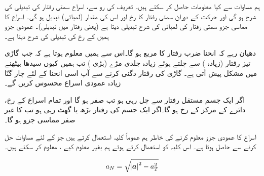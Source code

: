 ہم مساوات  سے کیا معلومات حاصل کر سکتے ہیں۔ تعریف کی رو سے،  اسراع  سمتی رفتار  کی  تبدیلی کی شرح ہو گی اور حرکت کے دوران سمتی رفتار کا رخ اور اس کی مقدار (لمبائی)  تبدیل ہو گی۔ اسراع کا مماسی جزو   سمتی رفتار   کی لمبائی کی شرح تبدیلی دیتا ہے (یعنی رفتار میں تبدیلی)۔ عمودی جزو  ہمیں  کے رخ کی تبدیلی کی شرح دیتا ہے۔

دھیان رہے کہ   انحنا ضرب رفتار کا مربع ہو گا۔اس سے ہمیں معلوم ہوتا ہے کہ جب  گاڑی تیز رفتار (زیادہ ) سے چلتے ہوئے زیادہ جلدی  مڑے (بڑی )   تب ہمیں  کیوں  سیدھا  بیٹھنے میں مشکل پیش آتی ہے۔ گاڑی کی رفتار دگنی کرنے سے آپ اسی انحنا کے لئے  چار گنّا  زیادہ عمودی اسراع محسوس کریں گے۔

اگر ایک جسم مستقل رفتار سے چل رہی ہو تب     صفر ہو گا اور تمام اسراع  کے رخ، دائرے کے مرکز کے رخ ہو گا۔اگر ایک جسم کی رفتار بڑھ یا گھٹ رہی ہو تب  کا غیر صفر مماسی جزو ہو گا۔

اسراع کا عمودی جزو  معلوم کرنے کی خاطر ہم عموماً کلیہ  استعمال کرتے ہیں جو  کے لئے 
 مساوات  حل کرنے سے حاصل ہوتا ہے۔ اس کلیہ کو استعمال کرتے ہوئے  ہم بغیر  معلوم کیے ،  معلوم کر سکتے ہیں۔

\begin{align}
a_N=\sqrt{\abs{{{\boldsymbol{a}}}}^2-a_T^2}
\end{align}
